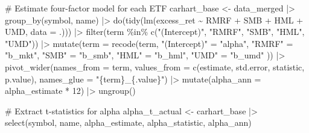 \documentclass[
  letterpaper,
  DIV=11,
  numbers=noendperiod]{scrartcl}
\newenvironment{Shaded}{\begin{snugshade}}{\end{snugshade}}
\newcommand{\AttributeTok}[1]{\textcolor[rgb]{0.40,0.45,0.13}{#1}}
\newcommand{\CommentTok}[1]{\textcolor[rgb]{0.37,0.37,0.37}{#1}}
\newcommand{\DecValTok}[1]{\textcolor[rgb]{0.68,0.00,0.00}{#1}}
\newcommand{\FunctionTok}[1]{\textcolor[rgb]{0.28,0.35,0.67}{#1}}
\newcommand{\NormalTok}[1]{\textcolor[rgb]{0.00,0.23,0.31}{#1}}
\newcommand{\OtherTok}[1]{\textcolor[rgb]{0.00,0.23,0.31}{#1}}
\newcommand{\SpecialCharTok}[1]{\textcolor[rgb]{0.37,0.37,0.37}{#1}}
\newcommand{\StringTok}[1]{\textcolor[rgb]{0.13,0.47,0.30}{#1}}
\begin{document}
\begin{Shaded}
\begin{Highlighting}[]
\CommentTok{\# Estimate four{-}factor model for each ETF}
\NormalTok{carhart\_base }\OtherTok{\textless{}{-}}\NormalTok{ data\_merged }\SpecialCharTok{|\textgreater{}}
  \FunctionTok{group\_by}\NormalTok{(symbol, name) }\SpecialCharTok{|\textgreater{}}
  \FunctionTok{do}\NormalTok{(}\FunctionTok{tidy}\NormalTok{(}\FunctionTok{lm}\NormalTok{(excess\_ret }\SpecialCharTok{\textasciitilde{}}\NormalTok{ RMRF }\SpecialCharTok{+}\NormalTok{ SMB }\SpecialCharTok{+}\NormalTok{ HML }\SpecialCharTok{+}\NormalTok{ UMD, }\AttributeTok{data =}\NormalTok{ .))) }\SpecialCharTok{|\textgreater{}}
  \FunctionTok{filter}\NormalTok{(term }\SpecialCharTok{\%in\%} \FunctionTok{c}\NormalTok{(}\StringTok{"(Intercept)"}\NormalTok{, }\StringTok{"RMRF"}\NormalTok{, }\StringTok{"SMB"}\NormalTok{, }\StringTok{"HML"}\NormalTok{, }\StringTok{"UMD"}\NormalTok{)) }\SpecialCharTok{|\textgreater{}}
  \FunctionTok{mutate}\NormalTok{(}\AttributeTok{term =} \FunctionTok{recode}\NormalTok{(term,}
    \StringTok{"(Intercept)"} \OtherTok{=} \StringTok{"alpha"}\NormalTok{, }\StringTok{"RMRF"} \OtherTok{=} \StringTok{"b\_mkt"}\NormalTok{,}
    \StringTok{"SMB"} \OtherTok{=} \StringTok{"b\_smb"}\NormalTok{, }\StringTok{"HML"} \OtherTok{=} \StringTok{"b\_hml"}\NormalTok{, }\StringTok{"UMD"} \OtherTok{=} \StringTok{"b\_umd"}
\NormalTok{  )) }\SpecialCharTok{|\textgreater{}}
  \FunctionTok{pivot\_wider}\NormalTok{(}\AttributeTok{names\_from =}\NormalTok{ term,}
              \AttributeTok{values\_from =} \FunctionTok{c}\NormalTok{(estimate, std.error, statistic, p.value),}
              \AttributeTok{names\_glue =} \StringTok{"\{term\}\_\{.value\}"}\NormalTok{) }\SpecialCharTok{|\textgreater{}}
  \FunctionTok{mutate}\NormalTok{(}\AttributeTok{alpha\_ann =}\NormalTok{ alpha\_estimate }\SpecialCharTok{*} \DecValTok{12}\NormalTok{) }\SpecialCharTok{|\textgreater{}}
  \FunctionTok{ungroup}\NormalTok{()}

\CommentTok{\# Extract t{-}statistics for alpha}
\NormalTok{alpha\_t\_actual }\OtherTok{\textless{}{-}}\NormalTok{ carhart\_base }\SpecialCharTok{|\textgreater{}}
  \FunctionTok{select}\NormalTok{(symbol, name, alpha\_estimate, alpha\_statistic, alpha\_ann)}


\end{Highlighting}
\end{Shaded}
\end{document}
